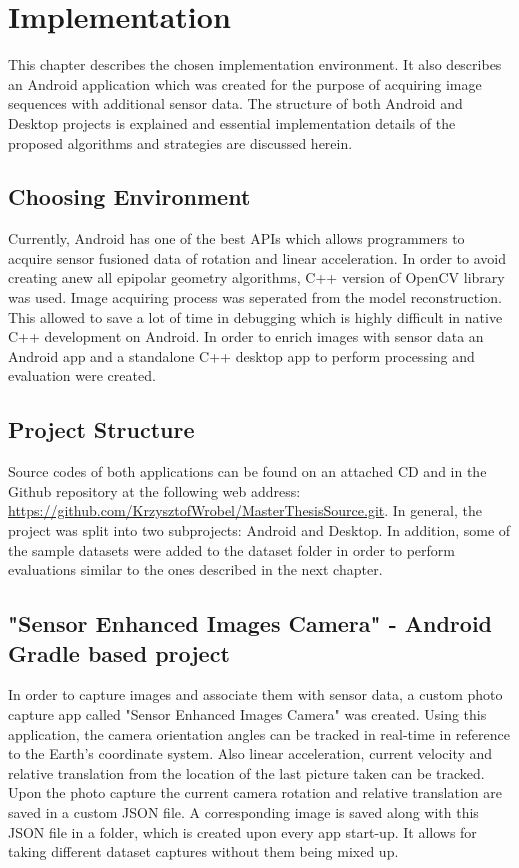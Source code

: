\ifpdf
    \graphicspath{{figures/}{figures/comparisons}}
\else
    \graphicspath{{figures/}{figures/comparisons}}
\fi

\chapter{Implementation} %
This chapter describes the chosen implementation environment. It also describes an Android application which was created for the purpose of acquiring image sequences with additional sensor data. The structure of both Android and Desktop projects is explained and essential implementation details of the proposed algorithms and strategies are discussed herein.
\section{Choosing Environment}
Currently, Android has one of the best APIs which allows programmers to acquire sensor fusioned data of rotation and linear acceleration.
In order to avoid creating anew all epipolar geometry algorithms, C++ version of OpenCV library was used. Image acquiring process was seperated from the model reconstruction. This allowed to save a lot of time in debugging which is highly difficult in native C++ development on Android. In order to enrich images with sensor data an Android app and a standalone C++ desktop app to perform processing and evaluation were created.
\section{Project Structure} \label{sec:ProjectStructure}
Source codes of both applications can be found on an attached CD and in the Github repository at the following web address: \url{https://github.com/KrzysztofWrobel/MasterThesisSource.git}. In general, the project was split into two subprojects: Android and Desktop. In addition, some of the sample datasets were added to the dataset folder in order to perform evaluations similar to the ones described in the next chapter.
\section{"Sensor Enhanced Images Camera" - Android Gradle based project}
In order to capture images and associate them with sensor data, a custom photo capture app called "Sensor Enhanced Images Camera" was created.
Using this application, the camera orientation angles can be tracked in real-time in reference to the Earth's coordinate system. Also linear acceleration, current velocity and relative translation from the location of the last picture taken can be tracked. 
Upon the photo capture the current camera rotation and relative translation are saved in a custom JSON file. A corresponding image is saved along with this JSON file in a folder, which is created upon every app start-up. It allows for taking different dataset captures without them being mixed up.
